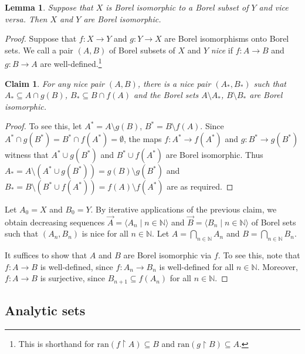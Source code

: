 \documentclass[10pt]{amsart}
\newcommand{\ran}{\mathrm{ran}}
\newcommand{\NN}{\mathbb{N}}
\newtheorem{lemma}[theorem]{Lemma}
\newtheorem*{claim*}{Claim}
\theoremstyle{definition}
\theoremstyle{remark}
\begin{document}
\begin{lemma} 
Suppose that $X$ is Borel isomorphic to a Borel subset of $Y$ and vice versa. 
Then $X$ and $Y$ are Borel isomorphic. 
\end{lemma} 
\begin{proof} 
Suppose that $f\colon X\rightarrow Y$ and $g\colon Y\rightarrow X$ are Borel isomorphisms onto Borel sets. 
We call a pair $(A,B)$ of Borel subsets of $X$ and $Y$ \emph{nice} if $f\colon A\rightarrow B$ and $g\colon B\rightarrow A$ are well-defined.\footnote{This is shorthand for $\ran(f{\upharpoonright}A)\subseteq B$ and $\ran(g{\upharpoonright}B)\subseteq A$. } 

\begin{claim*} 
For any nice pair $(A,B)$, there is a nice pair $(A_*,B_*)$ such that $A_*\subseteq A\cap g(B)$, $B_*\subseteq B\cap f(A)$ and the Borel sets $A\setminus A_*$, $B\setminus B_*$ are Borel isomorphic. 
\end{claim*} 
\begin{proof} 
To see this, let $A^*=A\setminus g(B)$, $B^*=B\setminus f(A)$. 
Since $A^*\cap g(B^*)=B^*\cap f(A^*)=\emptyset$, the maps $f\colon A^*\rightarrow f(A^*)$ and $g\colon B^*\rightarrow g(B^*)$ witness that 
$A^*\cup g(B^*)$ and $B^*\cup f(A^*)$ are Borel isomorphic. 
Thus $A_*=A\setminus (A^*\cup g(B^*))=g(B) \setminus g(B^*)$ and $B_*=B\setminus (B^*\cup f(A^*))=f(A)\setminus f(A^*)$ are as required. 
\end{proof} 

Let $A_0=X$ and $B_0=Y$. By iterative applications of the previous claim, we obtain decreasing sequences $\vec{A}=\langle A_n\mid n\in\NN\rangle$ and $\vec{B}=\langle B_n\mid n\in\NN\rangle$ of Borel sets such that $(A_n, B_n)$ is nice for all $n\in\NN$. Let $A=\bigcap_{n\in\NN} A_n$ and $B=\bigcap_{n\in\NN}B_n$. 

It suffices to show that $A$ and $B$ are Borel isomorphic via $f$. 
To see this, note that $f\colon A\rightarrow B$ is well-defined, since $f\colon A_n\rightarrow B_n$ is well-defined for all $n\in\NN$. 
Moreover, $f\colon A\rightarrow B$ is surjective, since $B_{n+1}\subseteq f(A_n)$ for all $n\in \NN$. 
\end{proof} 





\subsection{Analytic sets} 
\end{document}
